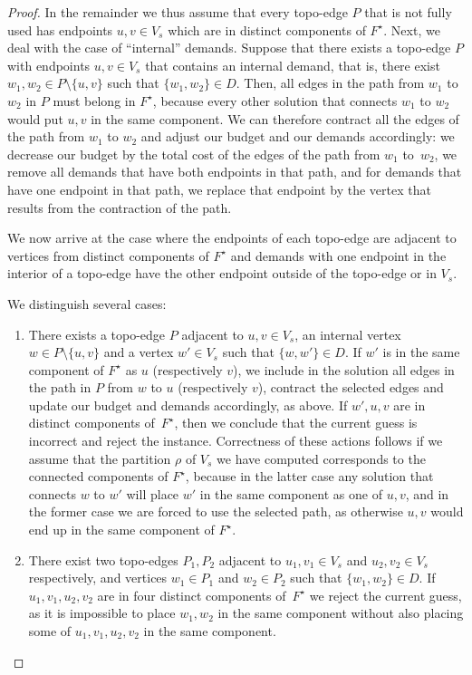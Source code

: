 \begin{proof}
In the remainder we thus assume that every topo-edge $P$ that is not fully used
has endpoints $u,v\in V_s$ which are in distinct components of $F^\star$. Next, we
deal with the case of ``internal'' demands. Suppose that there exists a
topo-edge $P$ with endpoints $u,v\in V_s$ that contains an internal demand,
that is, there exist $w_1,w_2\in P\setminus\{u,v\}$ such that $\{w_1,w_2\}\in
D$.  Then, all edges in the path from $w_1$ to $w_2$ in $P$ must belong in
$F^\star$, because every other solution that connects $w_1$ to $w_2$ would put
$u,v$ in the same component. We can therefore contract all the edges of the
path from $w_1$ to $w_2$ and adjust our budget and our demands
accordingly: we decrease our budget by the total cost of the edges of
the path from $w_1$ to~$w_2$, we remove all demands that have both endpoints in
that path, and for demands that have one endpoint in that path, we replace that
endpoint by the vertex that results from the contraction of the path.

We now arrive at the case where the endpoints of each topo-edge are adjacent to
vertices from distinct components of $F^\star$ and demands with one endpoint in the
interior of a topo-edge have the other endpoint outside of the topo-edge or in
$V_s$.

We distinguish several cases:

\begin{enumerate}

\item There exists a topo-edge $P$ adjacent to $u,v\in V_s$, an internal vertex
$w\in P\setminus\{u,v\}$ and a vertex $w'\in V_s$ such that $\{w,w'\}\in D$. If
$w'$ is in the same component of $F^\star$ as $u$ (respectively $v$), we include in
the solution all edges in the path in $P$ from $w$ to $u$ (respectively $v$),
contract the selected edges and update our budget and demands accordingly, as above. If
$w',u,v$ are in distinct components of~$F^\star$, then we conclude that the current
guess is incorrect and reject the instance. Correctness of these actions
follows if we assume that the partition $\rho$ of $V_s$ we have computed
corresponds to the connected components of $F^\star$, because in the latter case
any solution that connects $w$ to $w'$ will place $w'$ in the same component as
one of $u,v$, and in the former case we are forced to use the selected path, as
otherwise $u,v$ would end up in the same component of $F^\star$.

\item There exist two topo-edges $P_1,P_2$ adjacent to $u_1,v_1\in V_s$ and
$u_2,v_2\in V_s$ respectively, and vertices $w_1\in P_1$ and $w_2\in P_2$ such
that $\{w_1,w_2\}\in D$. If $u_1,v_1,u_2,v_2$ are in four distinct components
of~$F^\star$ we reject the current guess, as it is impossible to place $w_1,w_2$ in
the same component without also placing some of $u_1,v_1,u_2,v_2$ in the same
component.


\end{enumerate}
\end{proof}
